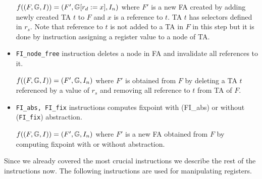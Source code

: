 \begin{itemize}
		$f((F, \mathbb{G}, I)) = (F', 
		\mathbb{G} [
			r_{d} := x], I_n)$
		where $F'$ is a new FA created by adding newly created TA $t$ to $F$
		and $x$ is a reference to $t$.
		TA $t$ has selectors defined in $r_s$. 
		Note that reference to $t$ is not added to a TA in $F$ in this step
		but it is done by instruction assigning a register value to a
		node of TA.
	
	\item {\tt FI\_node\_free} instruction deletes a node in FA and
		invalidate all references to it.
		
		$f((F, \mathbb{G}, I)) = (F', \mathbb{G}, I_n)$
		where $F'$ is obtained from $F$ by deleting a TA $t$ referenced
		by a value of $r_s$ and removing all reference to $t$ from TA of $F$.

	\item {\tt FI\_abs, FI\_fix} instructions computes fixpoint with (FI\_abs) or
		without ({\tt FI\_fix}) abstraction.
		
		$f((F, \mathbb{G}, I)) = (F', \mathbb{G}, I_n)$
		where $F'$ is a new FA obtained from $F$ by computing fixpoint with or without abstraction.

\end{itemize}

Since we already covered the most crucial instructions we describe
the rest of the instructions now.
The following instructions are used for manipulating registers.

